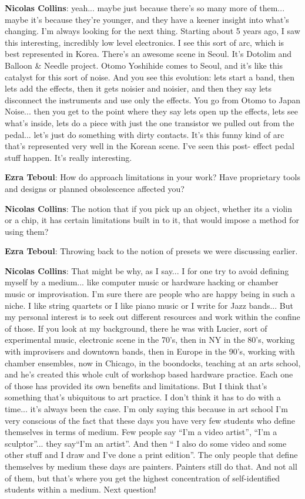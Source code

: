 \textbf{Nicolas Collins}: yeah... maybe just because there’s so many more of them... maybe it’s because they’re younger, and they have a keener insight into what’s changing. I’m always looking for the next thing. Starting about 5 years ago, I saw this interesting, incredibly low level electronics. I see this sort of arc, which is best represented in Korea. There’s an awesome scene in Seoul. It’s Dotolim and Balloon \& Needle project. Otomo Yoshihide comes to Seoul, and it’s like this catalyst for this sort of noise. And you see this evolution: lets start a band, then lets add the effects, then it gets noisier and noisier, and then they say lets disconnect the instruments and use only the effects. You go from Otomo to Japan Noise... then you get to the point where they say lets open up the effects, lets see what’s inside, lets do a piece with just the one transistor we pulled out from the pedal... let’s just do something with dirty contacts. It’s this funny kind of arc that’s represented very well in the Korean scene. I’ve seen this post- effect pedal stuff happen. It’s really interesting.
					
\textbf{Ezra Teboul}: How do approach limitations in your work? Have proprietary tools and designs or planned obsolescence affected you?
					
\textbf{Nicolas Collins}: The notion that if you pick up an object, whether its a violin or a chip, it has certain limitations built in to it, that would impose a method for using them?
					
\textbf{Ezra Teboul}: Throwing back to the notion of presets we were discussing earlier.
					
\textbf{Nicolas Collins}: That might be why, as I say... I for one try to avoid defining myself by a medium... like computer music or hardware hacking or chamber music or improvisation. I’m sure there are people who are happy being in such a niche. I like string quartets or I like piano music or I write for Jazz bands... But my personal interest is to seek out different resources and work within the confine of those. If you look at my background, there he was with Lucier, sort of experimental music, electronic scene in the 70’s, then in NY in the 80’s, working with improvisers and downtown bands, then in Europe in the 90’s, working with chamber ensembles, now in Chicago, in the boondocks, teaching at an arts school, and he’s created this whole cult of workshop based hardware practice. Each one of those has provided its own benefits and limitations. But I think that’s something that’s ubiquitous to art practice. I don’t think it has to do with a time... it’s always been the case. I’m only saying this because in art school I’m very conscious of the fact that these days you have very few students who define themselves in terms of medium. Few people say ``I’m a video artist'', ``I’m a sculptor''... they say``I’m an artist''. And then `` I also do some video and some other stuff and I draw and I’ve done a print edition''. The only people that define themselves by medium these days are painters. Painters still do that. And not all of them, but that’s where you get the
highest concentration of self-identified students within a medium. Next question!
					

